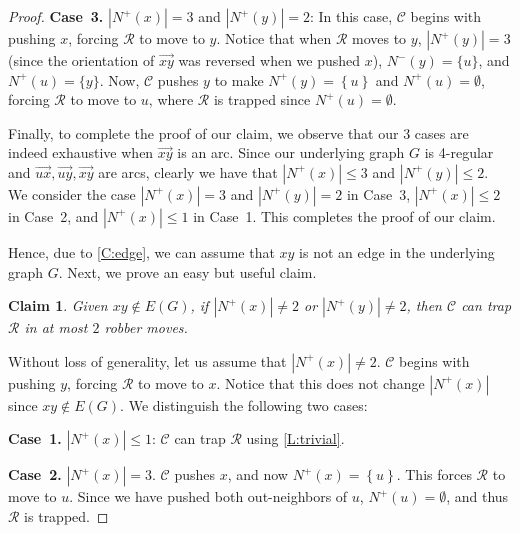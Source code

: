 \documentclass[a4paper,12pt]{amsart}
\newtheorem{claim}[theorem]{Claim}
\newcommand{\set}[1]{\left\{#1\right\}}
\newcommand{\R}{\mathcal{R}}
\newcommand{\C}{\mathcal{C}}
\newenvironment{proofofclaim}{%
  \renewcommand{\proofname}{Proof of Claim}\proof}{\endproof}
\let\leq\leqslant
\begin{document}
\begin{proof}
\begin{proofofclaim}
        \medskip
        \noindent\textbf{Case~3.} $|N^+(x)| = 3$ and $|N^+(y)| = 2$: In this case, $\C$ begins with pushing $x$, forcing   $\R$  to move to $y$. Notice that when $\R$ moves to $y$, $|N^+(y)| = 3$ (since the orientation of $\overrightarrow{xy}$ was reversed when we pushed $x$), $N^-(y) = \{u\}$, and $N^+(u) = \{y\}$. Now, $\C$ pushes $y$ to make $N^+(y) = \set{u}$ and $N^+(u) = \emptyset$, forcing   $\R$ to move to $u$, where $\R$ is trapped  since $N^+(u) = \emptyset$. 
    
    \medskip  
    Finally, to complete the proof of our claim, we observe that our 3 cases are indeed exhaustive when $\overrightarrow{xy}$ is an arc. Since our underlying graph $G$ is 4-regular and $\overrightarrow{ux}, \overrightarrow{uy}, \overrightarrow{xy}$ are arcs, clearly we have that $|N^+(x)| \leq 3$ and $|N^+(y)| \leq 2$. We consider the case $|N^+(x)| = 3$ and $|N^+(y)| = 2$ in Case~3, $|N^+(x)|\leq 2$ in Case~2, and $|N^+(x)|\leq 1$ in Case~1. This completes the proof of our claim.
    \end{proofofclaim}


    Hence, due to \cref{C:edge}, we can assume that $xy$ is not an edge in the underlying graph $G$. Next, we prove an easy but useful claim. 

    \begin{claim}\label{C:neighborvisited}
        Given $xy\notin E(G)$, if $|N^+(x)| \neq 2$ or $|N^+(y)| \neq 2$, then $\C$ can trap $\R$ in at most $2$ robber moves.
    \end{claim}
    \begin{proofofclaim}
        Without loss of generality, let us assume that $|N^+(x)|\neq 2$. $\C$ begins with pushing $y$, forcing $\R$ to move to $x$. Notice that this does not change $|N^+(x)|$ since $xy\notin E(G)$. We distinguish the following two cases:

        \medskip
        \noindent\textbf{Case~1.} $|N^+(x)|\leq 1$: $\C$ can trap $\R$ using \cref{L:trivial}.

        \medskip
        \noindent\textbf{Case~2.} $|N^+(x)| =3$. $\C$ pushes $x$, and now $N^+(x) = \set{u}$. This forces $\R$ to move to $u$. Since we have pushed both out-neighbors of $u$, $N^+(u) = \emptyset$, and thus $\R$ is trapped. 
    \end{proofofclaim}



\end{proof}
\end{document}
